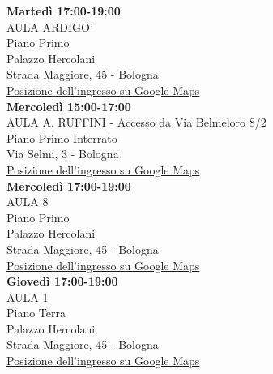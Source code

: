 \documentclass[11pt, a4paper]{article}
\begin{document}

\noindent
\textbf{Marted\`{i} 17:00-19:00}\\
AULA ARDIGO'\\
Piano Primo\\
Palazzo Hercolani\\ 
Strada Maggiore, 45 - Bologna \\
\href{https://goo.gl/maps/aVonfPV63NTkrmvm8}{Posizione dell'ingresso su Google Maps}\\

\noindent
\textbf{Mercoled\`{i} 15:00-17:00}\\
AULA A. RUFFINI - Accesso da Via Belmeloro 8/2 \\
Piano Primo Interrato \\
Via Selmi, 3 - Bologna \\
\href{https://goo.gl/maps/iqA6NbC71YwRTXKj6}{Posizione dell'ingresso su Google Maps}\\

\noindent
\textbf{Mercoled\`{i} 17:00-19:00}\\
AULA 8 \\
Piano Primo\\ 
Palazzo Hercolani \\
Strada Maggiore, 45 - Bologna \\
\href{https://goo.gl/maps/aVonfPV63NTkrmvm8}{Posizione dell'ingresso su Google Maps}\\

\noindent
\textbf{Gioved\`{i} 17:00-19:00}\\
AULA 1 \\
Piano Terra \\ 
Palazzo Hercolani \\ 
Strada Maggiore, 45 - Bologna \\\href{https://goo.gl/maps/aVonfPV63NTkrmvm8}{Posizione dell'ingresso su Google Maps}



\setcounter{lezione}{0}
\addtocounter{lezione}{1}
\end{document}
